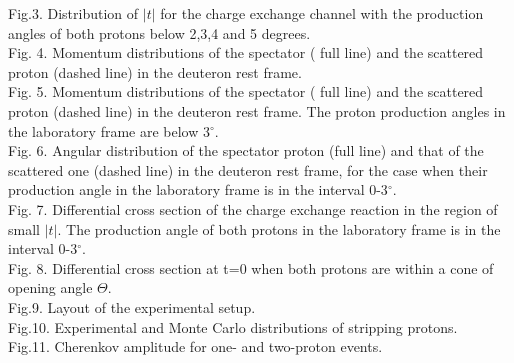 \documentclass[a4paper,12pt]{article}
\begin{document}
    \noindent
    Fig.3. Distribution of $\vert t \vert$ for the charge exchange channel with
    the
    production angles of both protons below 2,3,4 and 5 degrees. \\

    \noindent
    Fig. 4. Momentum distributions of the spectator ( full line)
    and  the scattered proton (dashed line) in the deuteron rest frame. \\

    \noindent
    Fig. 5. Momentum distributions of the spectator ( full line) and
    the scattered proton (dashed line) in the deuteron rest frame. The proton production angles
    in the laboratory frame are below 3$^{\circ}$. \\

    \noindent
    Fig. 6. Angular distribution of the spectator proton (full line) and that
    of the scattered one (dashed line) in the deuteron rest frame, for the case when their
    production angle in the laboratory frame is in the interval 0-3$^{\circ}$. \\

    \noindent
    Fig. 7. Differential cross section of the charge exchange reaction in
    the region of small $\vert t \vert$. The production angle of both protons
    in the laboratory frame is in the interval 0-3$^{\circ}$. \\

    \noindent
    Fig. 8. Differential cross section at t=0 when both protons are within
    a cone of opening angle $\Theta$. \\

    \noindent
    Fig.9.  Layout of the experimental setup. \\

    \noindent
    Fig.10. Experimental and Monte Carlo distributions of stripping protons.\\

    \noindent
    Fig.11. Cherenkov amplitude for one- and two-proton events.\\
\end{document}
